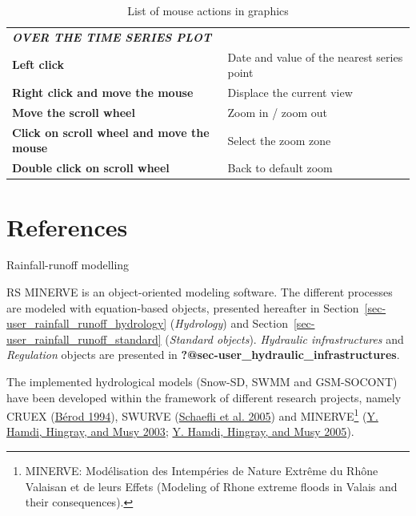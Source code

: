 \documentclass[
  letterpaper,
  DIV=11,
  numbers=noendperiod]{scrreprt}
\begin{document}
\hypertarget{tbl-list_mouse_actions_graphics}{}
\begin{longtable}[]{@{}
  >{\raggedright\arraybackslash}p{}
  >{\raggedright\arraybackslash}p{}@{}}
\caption{\label{tbl-list_mouse_actions_graphics}List of mouse actions in
graphics}\tabularnewline
\toprule()
\endhead
\textbf{\emph{OVER THE TIME SERIES PLOT}} & \\
\textbf{Left click} & Date and value of the nearest series point \\
\textbf{Right click and move the mouse} & Displace the current view \\
\textbf{Move the scroll wheel} & Zoom in / zoom out \\
\textbf{Click on scroll wheel and move the mouse} & Select the zoom
zone \\
\textbf{Double click on scroll wheel} & Back to default zoom \\
\bottomrule()
\end{longtable}

\hypertarget{references-1}{%
\chapter*{References}\label{references-1}}

Rainfall-runoff modelling

RS MINERVE is an object-oriented modeling software. The different
processes are modeled with equation-based objects, presented hereafter
in Section~\ref{sec-user_rainfall_runoff_hydrology} (\emph{Hydrology})
and Section~\ref{sec-user_rainfall_runoff_standard} (\emph{Standard
objects}). \emph{Hydraulic infrastructures} and \emph{Regulation}
objects are presented in
\textbf{?@sec-user\_hydraulic\_infrastructures}.

The implemented hydrological models (Snow-SD, SWMM and GSM-SOCONT) have
been developed within the framework of different research projects,
namely CRUEX (\protect\hyperlink{ref-berod_contribution_1994}{Bérod
1994}), SWURVE
(\protect\hyperlink{ref-schaefli_conceptual_2005}{Schaefli et al. 2005})
and MINERVE\footnote{MINERVE: Modélisation des Intempéries de Nature
  Extrême du Rhône Valaisan et de leurs Effets (Modeling of Rhone
  extreme floods in Valais and their consequences).}
(\protect\hyperlink{ref-hamdi_projet_2003}{Y. Hamdi, Hingray, and Musy
2003}; \protect\hyperlink{ref-hamdi_modeprevision_2005}{Y. Hamdi,
Hingray, and Musy 2005}).
\end{document}
